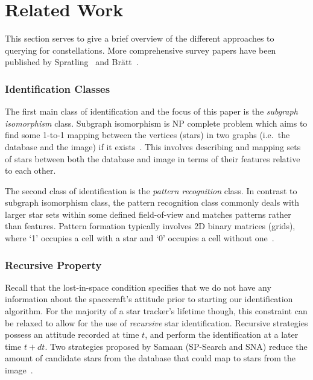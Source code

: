 \newcommand{\nsubparagraph}[1]{\subsubsection{#1}}

\section{Related Work}\label{sec:relatedWork}
This section serves to give a brief overview of the different approaches to querying for constellations.
More comprehensive survey papers have been published by Spratling~\cite{spratling:surveyStarIdentification} and
Br\"{a}tt~\cite{bratt:analysisStarIdentification}.

\nsubparagraph{Identification Classes}
The first main class of identification and the focus of this paper is the \textit{subgraph isomorphism} class.
Subgraph isomorphism is NP complete problem which aims to find some 1-to-1 mapping between the vertices (stars) in two
graphs (i.e.\ the database and the image) if it exists~\cite{scott:graphIsomorphismProblem}.
This involves describing and mapping sets of stars between both the database and image in terms of their features
relative to each other.

The second class of identification is the \textit{pattern recognition} class.
In contrast to subgraph isomorphism class, the pattern recognition class commonly deals with larger star sets within
some defined field-of-view and matches patterns rather than features.
Pattern formation typically involves 2D binary matrices (grids), where `1' occupies a cell with a star and `0' occupies
a cell without one~\cite{padgett:gridAlgorithm}.

%
%
%

\nsubparagraph{Recursive Property}
Recall that the lost-in-space condition specifies that we do not have any information about the spacecraft's attitude
prior to starting our identification algorithm.
For the majority of a star tracker's lifetime though, this constraint can be relaxed to allow for the use of
\textit{recursive} star identification.
Recursive strategies possess an attitude recorded at time $t$, and perform the identification at a later time $t + dt$.
Two strategies proposed by Samaan (SP-Search and SNA) reduce the amount of candidate stars from the database that could
map to stars from the image~\cite{samaan:recursiveMode}.

